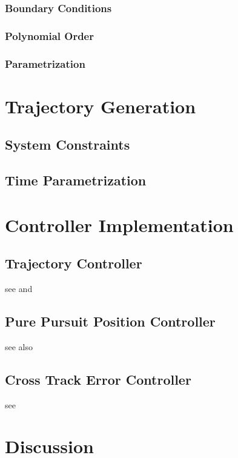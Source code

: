 \subsubsection{Boundary Conditions}
\subsubsection{Polynomial Order}
\subsubsection{Parametrization}

\section{Trajectory Generation}
\label{sec:trajectoryGeneration}
\subsection{System Constraints}
\subsection{Time Parametrization}

\section{Controller Implementation}
\label{sec:controllerImplementation}
\subsection{Trajectory Controller}
see \cite{snider} and \cite{deluca}
\subsection{Pure Pursuit Position Controller}
see also \cite{snider}
\subsection{Cross Track Error Controller}
see \cite{williams}

\section{Discussion}
\label{sec:discussion}

